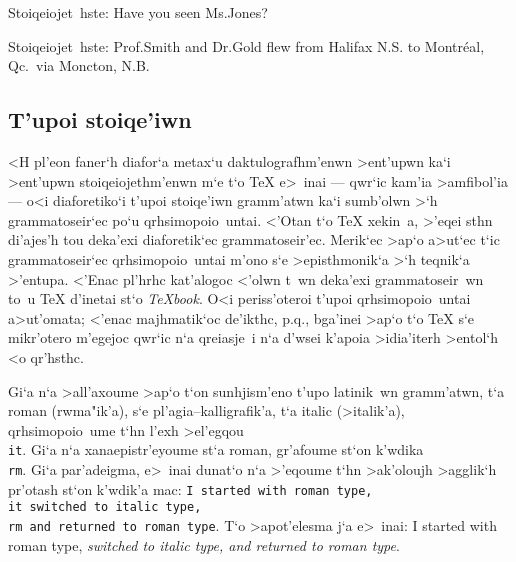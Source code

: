 \exercise Stoiqeiojet~hste: {\rm Have you seen Ms.\NB Jones? }

\exercise Stoiqeiojet~hste: {\rm Prof.\NB Smith and Dr.\NB Gold flew from
Halifax N.\NB S. to Montr\'eal, Qc.\ via Moncton, N.\NB B. }


\subsection{T'upoi stoiqe'iwn}

<H pl'eon faner`h diafor`a metax`u daktulografhm'enwn >ent'upwn ka`i
>ent'upwn stoiqeio\-je\-thm'enwn m`e t`o {\rm \TeX} e>~inai --- qwr`ic
kam'ia >amfibol'ia --- o<i diaforetiko`i {\tengs t'upoi stoiqe'iwn\/}
gramm'atwn ka`i sumb'olwn >`h {\tengs grammatoseir`ec\/} po`u
qrhsimopoio~untai. <'Otan t`o {\rm \TeX} xekin~a, >'eqei sthn di'ajes'h
tou deka'exi diaforetik`ec grammatoseir'ec.  Merik`ec >ap`o a>ut`ec t`ic
gram\-ma\-to\-seir`ec qrhsimopoio~untai m'ono s`e >episthmonik`a >`h
teqnik`a >'entupa.  <'Enac pl'hrhc kat'alogoc <'olwn t~wn deka'exi
grammatoseir~wn to~u {\rm \TeX} d'inetai st`o {\sl \TeX{}book}.%
O<i periss'oteroi t'upoi qrhsimopoio~untai a>ut'omata; <'enac
majhmatik`oc de'ikthc, p.q., bga'inei >ap`o t`o {\rm \TeX} s`e
mikr'otero m'egejoc qwr`ic n`a qreiasje~i n`a d'wsei k'apoia >idia'iterh
>entol`h <o qr'hsthc.

Gi`a n`a >all'axoume >ap`o t`on sunhjism'eno t'upo latinik~wn           
gramm'atwn, t`a {\rm roman} (rwma"ik'a), s`e pl'agia--kalligrafik'a, t`a 
{\rm italic} (>italik'a), qrhsimopoio~ume t`hn l'exh >el'egqou {\tt
\\it}. Gi`a n`a xana\-epi\-str'e\-youme st`a {\rm roman}, gr'afoume
st`on k'wdika {\tt \\rm}.  Gi`a par'adeigma, e>~inai dunat`o n`a
>'eqoume t`hn >ak'oloujh >agglik`h pr'otash st`on k'wdik'a mac: {\tt I
started with roman type, \\it switched to italic type, \\rm and returned
to roman type}.  T`o >apot'elesma j`a e>~inai: {\rm I started with roman
type, \it switched to italic type, \rm and returned to roman
type}.

